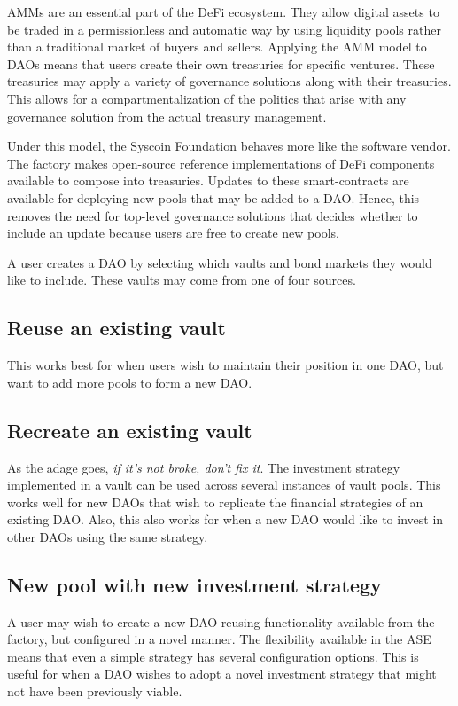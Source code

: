 \documentclass[journal,twocolumn,12pt]{ieeesyscoin}
\begin{document}
AMMs are an essential part of the DeFi ecosystem. They allow digital assets to be traded in a permissionless and automatic way by using liquidity pools rather than a traditional market of buyers and sellers. Applying the AMM model to DAOs means that users create their own treasuries for specific ventures. These treasuries may apply a variety of governance solutions along with their treasuries. This allows for a compartmentalization of the politics that arise with any governance solution from the actual treasury management.

Under this model, the Syscoin Foundation behaves more like the software vendor. The factory makes open-source reference implementations of DeFi components available to compose into treasuries. Updates to these smart-contracts are available for deploying new pools that may be added to a DAO. Hence, this removes the need for top-level governance solutions that decides whether to include an update because users are free to create new pools.

A user creates a DAO by selecting which vaults and bond markets they would like to include. These vaults may come from one of four sources.

\subsection{Reuse an existing vault}

This works best for when users wish to maintain their position in one DAO, but want to add more pools to form a new DAO.

\subsection{Recreate an existing vault}

As the adage goes, \textit{if it’s not broke, don’t fix it}. The investment strategy implemented in a vault can be used across several instances of vault pools. This works well for new DAOs that wish to replicate the financial strategies of an existing DAO. Also, this also works for when a new DAO would like to invest in other DAOs using the same strategy.

\subsection{New pool with new investment strategy}

A user may wish to create a new DAO reusing functionality available from the factory, but configured in a novel manner. The flexibility available in the ASE means that even a simple strategy has several configuration options. This is useful for when a DAO wishes to adopt a novel investment strategy that might not have been previously viable.
\end{document}
